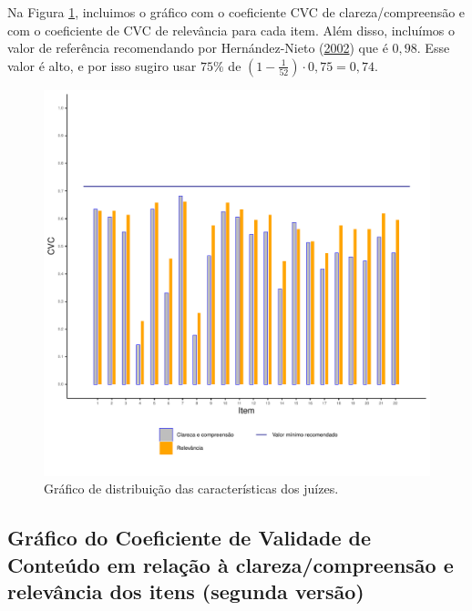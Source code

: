 \documentclass[
]{article}
\begin{document}
Na Figura \ref{fig:grafico2V1}, incluimos o gráfico com o coeficiente CVC de clareza/compreensão e com o coeficiente de CVC de relevância para cada item. Além disso, incluímos o valor de referência recomendando por Hernández-Nieto (\protect\hyperlink{ref-hernandez2002contributions}{2002}) que é \(0,98\). Esse valor é alto, e por isso sugiro usar \(75\%\) de \(\left(1 - \frac{1}{52}\right) \cdot 0,75 = 0,74\).

\begin{figure}[htbp]

{\centering \includegraphics[width=0.9\linewidth]{../figures/grafico2_0_8} 

}

\caption{Gráfico de distribuição das características dos juízes.}\label{fig:grafico2V1}
\end{figure}

\newpage

\hypertarget{gruxe1fico-do-coeficiente-de-validade-de-conteuxfado-em-relauxe7uxe3o-uxe0-clarezacompreensuxe3o-e-relevuxe2ncia-dos-itens-segunda-versuxe3o}{%
\subsection{Gráfico do Coeficiente de Validade de Conteúdo em relação à clareza/compreensão e relevância dos itens (segunda versão)}\label{gruxe1fico-do-coeficiente-de-validade-de-conteuxfado-em-relauxe7uxe3o-uxe0-clarezacompreensuxe3o-e-relevuxe2ncia-dos-itens-segunda-versuxe3o}}
\end{document}
